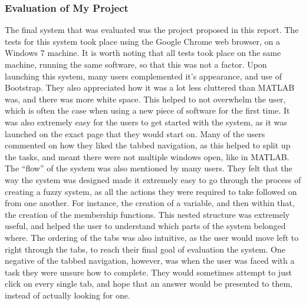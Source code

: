 \subsubsection{Evaluation of My Project}	
\vspace{-3mm}
The final system that was evaluated was the project proposed in this report. The tests for this system took place using the Google Chrome web browser, on a Windows 7 machine. It is worth noting that all tests took place on the same machine, running the same software, so that this was not a factor. Upon launching this system, many users complemented it's appearance, and use of Bootstrap. They also appreciated how it was a lot less cluttered than MATLAB was, and there was more white space. This helped to not overwhelm the user, which is often the case when using a new piece of software for the first time. It was also extremely easy for the users to get started with the system, as it was launched on the exact page that they would start on. Many of the users commented on how they liked the tabbed navigation, as this helped to split up the tasks, and meant there were not multiple windows open, like in MATLAB. The ``flow'' of the system was also mentioned by many users. They felt that the way the system was designed made it extremely easy to go through the process of creating a fuzzy system, as all the actions they were required to take followed on from one another. For instance, the creation of a variable, and then within that, the creation of the membership functions. This nested structure was extremely useful, and helped the user to understand which parts of the system belonged where. The ordering of the tabs was also intuitive, as the user would move left to right through the tabs, to reach their final goal of evaluation the system. One negative of the tabbed navigation, however, was when the user was faced with a task they were unsure how to complete. They would sometimes attempt to just click on every single tab, and hope that an answer would be presented to them, instead of actually looking for one.\ \\
\ \\
